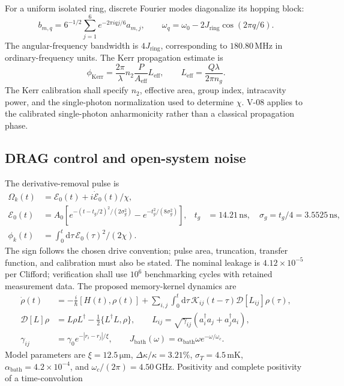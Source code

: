 \documentclass[11pt,a4paper]{article}
\newcommand{\dd}{\mathrm d}
\newcommand{\unit}[1]{\,\mathrm{#1}}
\begin{document}
For a uniform isolated ring, discrete Fourier modes diagonalize its hopping block:
\[
 b_{m,q}=6^{-1/2}\sum_{j=1}^{6}e^{-2\pi iqj/6}a_{m,j},\qquad
 \omega_q=\omega_0-2J_{\mathrm{ring}}\cos(2\pi q/6).
\]
The angular-frequency bandwidth is $4J_{\mathrm{ring}}$, corresponding to
$180.80\unit{MHz}$ in ordinary-frequency units.
The Kerr propagation estimate is
\[
 \phi_{\mathrm{Kerr}}=\frac{2\pi}{\lambda}n_2\frac{P}{A_{\mathrm{eff}}}L_{\mathrm{eff}},
 \qquad L_{\mathrm{eff}}=\frac{Q\lambda}{2\pi n_g}.
\]
The Kerr calibration shall specify $n_2$, effective area, group index, intracavity
power, and the single-photon normalization used to determine $\chi$. V-08 applies
to the calibrated single-photon anharmonicity rather than a classical propagation phase.

\subsection{DRAG control and open-system noise}
The derivative-removal pulse is
\begin{align}
 \Omega_k(t)&=\mathcal E_0(t)+i\dot{\mathcal E}_0(t)/\chi,\\
 \mathcal E_0(t)&=A_0\left[e^{-(t-t_g/2)^2/(2\sigma_g^2)}-e^{-t_g^2/(8\sigma_g^2)}\right],
 &t_g&=14.21\unit{ns},\quad\sigma_g=t_g/4=3.5525\unit{ns},\\
 \phi_k(t)&=\int_0^t\dd\tau\,\mathcal E_0(\tau)^2/(2\chi).
\end{align}
The sign follows the chosen drive convention; pulse area, truncation, transfer function, and
calibration must also be stated. The nominal leakage is $4.12\times10^{-5}$ per Clifford;
verification shall use $10^6$ benchmarking cycles with retained measurement data.
The proposed memory-kernel dynamics are
\begin{align}
 \dot\rho(t)&=-\frac{i}{\hbar}[H(t),\rho(t)]
 +\sum_{i,j}\int_0^t\dd\tau\,\mathcal K_{ij}(t-\tau)\mathcal D[L_{ij}]\rho(\tau),\\
 \mathcal D[L]\rho&=L\rho L^\dagger-\tfrac12\{L^\dagger L,\rho\},\qquad
 L_{ij}=\sqrt{\gamma_{ij}}(a_i^\dagger a_j+a_j^\dagger a_i),\\
 \gamma_{ij}&=\gamma_0e^{-|r_i-r_j|/\xi},\qquad
 J_{\mathrm{bath}}(\omega)=\alpha_{\mathrm{bath}}\omega e^{-\omega/\omega_c}.
\end{align}
Model parameters are $\xi=12.5\unit{\mu m}$, $\Delta\kappa/\kappa=3.21\%$,
$\sigma_T=4.5\unit{mK}$, $\alpha_{\mathrm{bath}}=4.2\times10^{-4}$, and
$\omega_c/(2\pi)=4.50\unit{GHz}$. Positivity and complete positivity of a time-convolution
\end{document}
